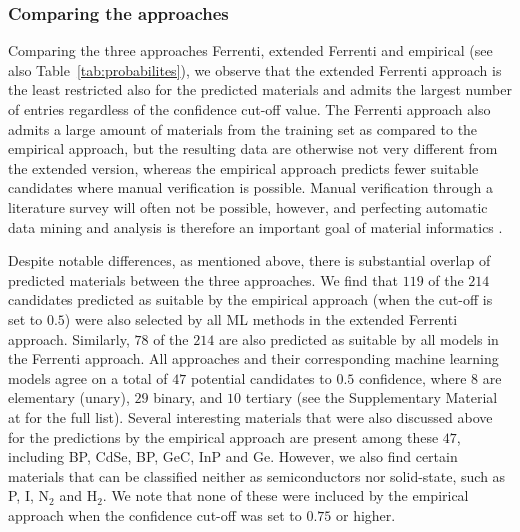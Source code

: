 \documentclass[superscriptaddress,unsortedaddress,
 amsmath,amssymb,
 aps,
]{revtex4-2}
\begin{document}
\subsubsection*{Comparing the approaches}
Comparing the three approaches Ferrenti, extended Ferrenti and empirical (see also Table~\ref{tab:probabilites}), we observe  that the extended Ferrenti approach is the least restricted also for the predicted materials and admits the largest number of entries regardless of the confidence cut-off value. The Ferrenti approach also admits a large amount of materials from the training set as compared to the empirical approach, but the resulting data are otherwise not very different from the extended version, whereas the empirical approach predicts fewer suitable candidates where manual verification is possible. Manual verification through a literature survey will often not be possible, however, and perfecting automatic data mining and analysis is therefore an important goal of material informatics \cite{rickman2019}. 

Despite notable differences, as mentioned above, there is substantial overlap of predicted materials between the three approaches. 
We find that $119$ of the $214$ candidates predicted as suitable by the empirical approach (when the cut-off is set to $0.5$) were also selected by all ML methods in the extended Ferrenti approach. 
Similarly, $78$ of the $214$ are also predicted as suitable by all models in the Ferrenti approach. All approaches and their corresponding machine learning models agree on a total of $47$ potential candidates to $0.5$ confidence, where $8$ are elementary (unary), $29$ binary, and $10$ tertiary  
(see the Supplementary Material at \cite{supplementary} for the full list). 
Several interesting materials that were also discussed above for the predictions by the empirical approach are present among these $47$, including BP, CdSe, BP, GeC, InP and Ge. However, we also find certain materials that can be classified neither as semiconductors nor solid-state, such as P, I, N$_2$ and H$_2$. We note that none of these were incluced by the empirical approach when the confidence cut-off was set to $0.75$ or higher. 
\end{document}
